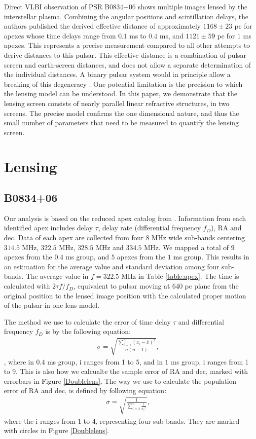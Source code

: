 \documentclass[useAMS,usenatbib]{mn2e}
\begin{document}
Direct VLBI observation of PSR B0834+06 shows multiple images lensed
by the interstellar plasma.  Combining the angular positions and
scintillation delays, the authors published the derived effective
distance \citep{2010ApJ...708..232B} of approximately $1168\pm 23$ pc
for apexes whose time delays range from $0.1$ ms to $0.4$ ms, and
$1121\pm 59$ pc for $1$ ms apexes.  This represents a precise
measurement compared to all other attempts to derive distances to this
pulsar.  This effective distance is a combination of pulsar-screen and
earth-screen distances, and does not allow a separate determination of
the individual distances.  A binary pulsar system would in principle
allow a breaking of this degeneracy \citep{2014MNRAS.442.3338P}. One
potential limitation is the precision to which the lensing model can
be understood.  In this paper, we demonstrate that the lensing screen
consists of nearly parallel linear refractive structures, in two
screens.  The precise model confirms the one dimensional nature, and
thus the small number of parameters that need to be measured to
quantify the lensing screen. 

\section{Lensing}
\subsection{B0834+06}
\label{21}
Our analysis is based on the reduced apex catalog from
\citet{2010ApJ...708..232B}. Information from each identified apex includes delay $\tau$,
delay rate (differential frequency $f_D$), RA and dec. Data of each apex are collected from four $8$ MHz wide sub-bands centering $314.5$ MHz, $322.5$ MHz, $328.5$ MHz and $334.5$ MHz. We mapped
a total of $9$ apexes from the $0.4$ ms group, and $5$ apexes from the $1$ ms
group. This results in an estimation
for the average value and standard deviation among four sub-bands. The average value in $f=322.5$ MHz in Table
\ref{table:apex}. The time is calculated with $2{\tau}f/{f_{D}}$,
equivalent to pulsar moving at $640$ pc plane from the
original position to the lensed image position with the calculated proper motion of the pulsar in one lens model.

The method we use to calculate the error of time delay $\tau$ and differential frequency $f_D$ is by the following equation:
\begin{align*}
\sigma = \sqrt{\frac{\sum^n_{i=1}(x_i-\bar{x})^2}{n(n-1)}},
\end{align*}
, where in $0.4$ ms group, i ranges from 1 to 5, and in $1$ ms group, i ranges from 1 to 9. This is also how we calcualte the sample error of RA and dec, marked with errorbars in Figure \ref{Doublelens}.
The way we use to calculate the population error of RA and dec, is defined by following equation:
\begin{align*}
\sigma = \sqrt{\frac{1}{\sum^n_{i=1}{\frac{1}{{\sigma_i}^2}}}},
\end{align*}
where the i ranges from 1 to 4, representing four sub-bands. They are marked with circles in Figure \ref{Doublelens}.
\end{document}
